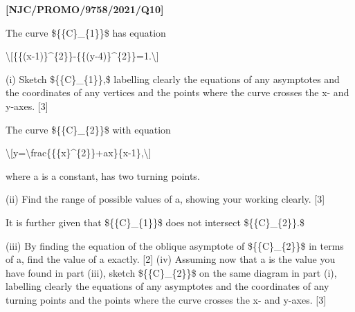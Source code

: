 \item \textbf{{[}NJC/PROMO/9758/2021/Q10{]}} 

The curve \$\{\{C\}\_\{1\}\}\$ has equation

\textbackslash{[}\{\{(x-1)\}\textasciicircum\{2\}\}-\{\{(y-4)\}\textasciicircum\{2\}\}=1.\textbackslash{]}

(i) Sketch \$\{\{C\}\_\{1\}\},\$ labelling clearly the equations of
any asymptotes and the coordinates of any vertices and the points
where the curve crosses the x- and y-axes. {[}3{]} 

The curve \$\{\{C\}\_\{2\}\}\$ with equation

\textbackslash{[}y=\textbackslash frac\{\{\{x\}\textasciicircum\{2\}\}+ax\}\{x-1\},\textbackslash{]}

where a is a constant, has two turning points.

(ii) Find the range of possible values of a, showing your working
clearly. {[}3{]}

It is further given that \$\{\{C\}\_\{1\}\}\$ does not intersect \$\{\{C\}\_\{2\}\}.\$

(iii) By finding the equation of the oblique asymptote of \$\{\{C\}\_\{2\}\}\$
in terms of a, find the value of a exactly. {[}2{]} (iv) Assuming
now that a is the value you have found in part (iii), sketch \$\{\{C\}\_\{2\}\}\$
on the same diagram in part (i), labelling clearly the equations of
any asymptotes and the coordinates of any turning points and the points
where the curve crosses the x- and y-axes. {[}3{]}
